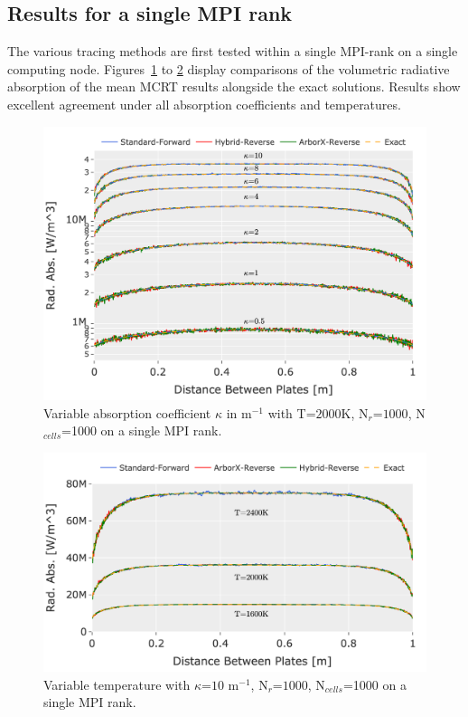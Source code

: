 \subsection{Results for a single MPI rank}
The various tracing methods are first tested within a single MPI-rank on a single computing node.
Figures~\ref{fig:PPcomp_kappa} to \ref{fig:PPcomp_temp} display comparisons of the volumetric radiative absorption of the mean MCRT results alongside the exact solutions.
Results show excellent agreement under all absorption coefficients and temperatures. 
\begin{figure}[!ht]
\centering
\includegraphics[width=0.95\linewidth]{figures/ch4/PPcomparison1.png}
\caption{Variable absorption coefficient $\kappa{}$ in m$^{-1}$ with T=$2000$K, N$_r$=$1000$, N$_{cells}$=1000 on a single MPI rank.}
\label{fig:PPcomp_kappa}
\end{figure}
\begin{figure}[!ht]
\centering
\includegraphics[width=0.95\linewidth]{figures/ch4/PPcomparison2.png}
\caption{Variable temperature with $\kappa{}$=$10$ m$^{-1}$, N$_r$=$1000$, N$_{cells}$=1000 on a single MPI rank.}
\label{fig:PPcomp_temp}
\end{figure}


